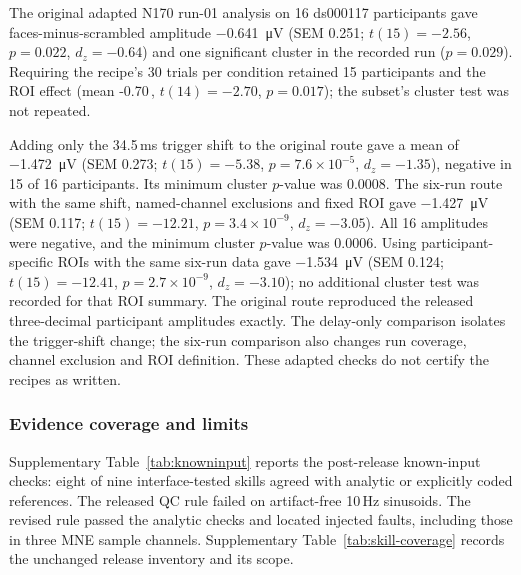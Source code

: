 The original adapted N170 run-01 analysis on 16 ds000117 participants gave faces-minus-scrambled amplitude \SI{-0.641}{\uV} (SEM 0.251; \(t(15) = -2.56\), \(p = 0.022\), \(d_z = -0.64\)) and one significant cluster in the recorded run (\(p = 0.029\)). Requiring the recipe's 30 trials per condition retained 15 participants and the ROI effect (mean -0.70\,\uV{}, \(t(14) = -2.70\), \(p = 0.017\)); the subset's cluster test was not repeated.

Adding only the 34.5\,ms trigger shift to the original route gave a mean of \SI{-1.472}{\uV} (SEM 0.273; \(t(15) = -5.38\), \(p = 7.6\times10^{-5}\), \(d_z = -1.35\)), negative in 15 of 16 participants. Its minimum cluster \(p\)-value was 0.0008. The six-run route with the same shift, named-channel exclusions and fixed ROI gave \SI{-1.427}{\uV} (SEM 0.117; \(t(15) = -12.21\), \(p = 3.4\times10^{-9}\), \(d_z = -3.05\)). All 16 amplitudes were negative, and the minimum cluster \(p\)-value was 0.0006. Using participant-specific ROIs with the same six-run data gave \SI{-1.534}{\uV} (SEM 0.124; \(t(15) = -12.41\), \(p = 2.7\times10^{-9}\), \(d_z = -3.10\)); no additional cluster test was recorded for that ROI summary. The original route reproduced the released three-decimal participant amplitudes exactly. The delay-only comparison isolates the trigger-shift change; the six-run comparison also changes run coverage, channel exclusion and ROI definition. These adapted checks do not certify the recipes as written.

\subsubsection*{Evidence coverage and limits}

Supplementary Table~\ref*{tab:knowninput} reports the post-release known-input checks: eight of nine interface-tested skills agreed with analytic or explicitly coded references. The released QC rule failed on artifact-free 10\,Hz sinusoids. The revised rule passed the analytic checks and located injected faults, including those in three MNE sample channels. Supplementary Table~\ref*{tab:skill-coverage} records the unchanged release inventory and its scope.


